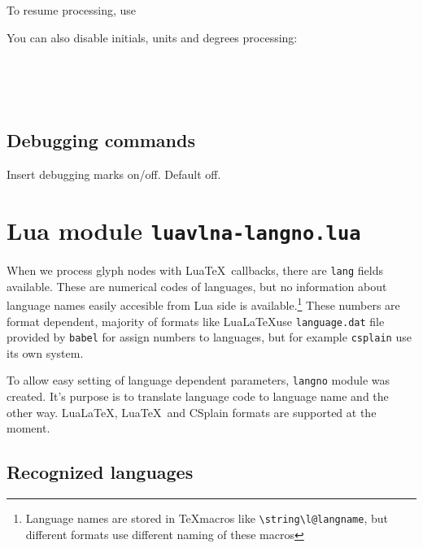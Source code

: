 \documentclass[12pt]{ltxdoc}
\newenvironment{mycode}{
	\medskip%
	\parindent=0pt%
}{\medskip}
\begin{document}
\begin{mycode}
\cmd{\preventsingleoff}
\end{mycode}

To resume processing, use

\begin{mycode}
\cmd{\preventsingleon}
\end{mycode}

You can also disable initials, units and degrees processing:

\begin{mycode}
  \cmd{\noinitials}\\
  \cmd{\nounits}\\
  \cmd{\nopredegrees}\\
  \cmd{\nosufdegrees}
\end{mycode}


\subsection{Debugging commands}
\begin{mycode}
\cmd{\preventsingledebugon}\par
\cmd{\preventsingledebugoff}
\end{mycode}

Insert debugging marks on/off. Default off.

\section{Lua module \texttt{luavlna-langno.lua}}

When we process glyph nodes with Lua\TeX\ callbacks, there are \verb|lang| 
fields available. These are numerical codes of languages, but no information
about language names easily accesible from Lua side is available.\footnote{%
	Language names are stored in \TeX macros like \verb|\string\l@langname|, but 
	different formats use different naming of these macros}
These numbers are format dependent, majority of formats like 
Lua\LaTeX use \verb|language.dat| file provided by \verb|babel| 
for assign numbers to languages, but for example \verb|csplain| 
use its own system.

To allow easy setting of language dependent parameters, \verb|langno| module 
was created. It's purpose is to translate language code to language name and 
the other way. Lua\LaTeX, Lua\TeX\ and CSplain formats are supported at the moment.

\subsection{Recognized languages}
\end{document}
